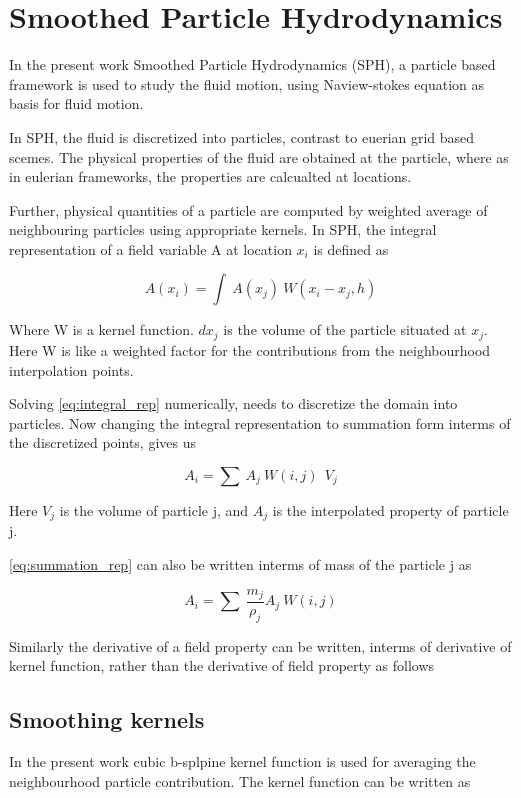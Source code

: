 \chapter{Smoothed Particle Hydrodynamics}
\label{chap:SPH}

In the present work Smoothed Particle Hydrodynamics (SPH), a particle based
framework is used to study the fluid motion, using Naview-stokes
equation as basis for fluid motion.

In SPH, the fluid is discretized into particles, contrast to euerian
grid based scemes. The physical properties of the fluid are obtained
at the particle, where as in eulerian frameworks, the properties are
calcualted at locations.

Further, physical quantities of a particle are computed by weighted
average of neighbouring particles using appropriate kernels. In SPH,
the integral representation of a field variable A at location $x_i$ is
defined as

\begin{equation}
  \label{eq:integral_rep}
  A(x_i) = \int\> A(x_j) \>W(x_i - x_j, h)
\end{equation}

Where W is a kernel function. $dx_{j}$ is the volume of the particle
situated at $x_j$. Here W is like a weighted factor for the
contributions from the neighbourhood interpolation points.

Solving \eqref{eq:integral_rep} numerically, needs to discretize the
domain into particles. Now changing the integral representation to
summation form interms of the discretized points, gives us

\begin{equation}
  \label{eq:summation_rep}
  A_i = \sum\> A_j\> W(i,j)\>\> V_j
\end{equation}

Here $V_j$ is the volume of particle j, and $A_j$ is the interpolated
property of particle j.

\eqref{eq:summation_rep} can also be written interms of mass of the particle j
as

\begin{equation}
  \label{eq:summation_mass_rep}
  A_i = \sum\> \frac{m_j}{\rho_j} A_j\> W(i,j)
\end{equation}

Similarly the derivative of a field property can be written, interms
of derivative of kernel function, rather than the derivative of field
property as follows


\section{Smoothing kernels}
\label{sec:sk}


In the present work cubic b-splpine kernel function is used
for averaging the neighbourhood particle contribution. The kernel
function can be written as
